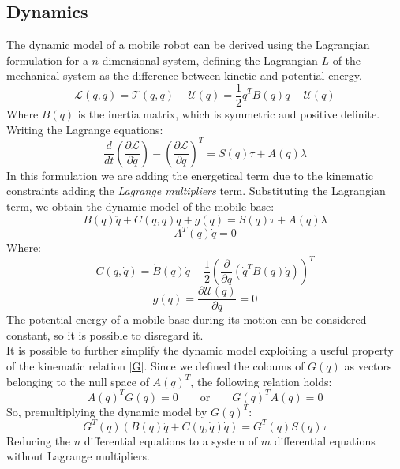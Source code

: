 \subsection{Dynamics}
The dynamic model of a mobile robot can be derived using the Lagrangian formulation for a $n$-dimensional system, defining the Lagrangian $L$ of the mechanical system as the difference between kinetic and potential energy.
\begin{equation}
\mathcal{L}(q,\dot{q})=\mathcal{T}(q,\dot{q})-\mathcal{U}(q)=\frac{1}{2}\dot{q}^T B(q)\dot{q} - \mathcal{U}(q)
\end{equation}
Where $B(q)$ is the inertia matrix, which is symmetric and positive definite.\\
Writing the Lagrange equations:
\begin{equation}
\frac{d}{dt}\left(\frac{\partial\mathcal{L}}{\partial\dot{q}} \right) - \left(\frac{\partial\mathcal{L}}{\partial q} \right)^T=S(q)\tau+A(q)\lambda
\end{equation}
In this formulation we are adding the energetical term due to the kinematic constraints adding the \textit{Lagrange multipliers} term. 
Substituting the Lagrangian term, we obtain the dynamic model of the mobile base:
\begin{equation}
B(q)\ddot{q}+C(q,\dot{q})\dot{q}+g(q) = S(q)\tau+A(q)\lambda
\end{equation}
\begin{equation*} 
A^T \left( q \right)\dot{q} =0  
\end{equation*}
Where:
\begin{equation}
C(q,\dot{q})=\dot{B}(q)\dot{q}-\frac{1}{2}\left(\frac{\partial}{\partial q}\left( \dot{q}^T B(q)\dot{q}\right)\right)^T
\end{equation}
\begin{equation}
g(q) = \frac{\partial\mathcal{U}(q)}{\partial q} = 0
\end{equation}
The potential energy of a mobile base during its motion can be considered constant, so it is possible to disregard it.\\
It is possible to further simplify the dynamic model exploiting a useful property of the kinematic relation \ref{G}. Since we defined the coloums of $G(q)$ as vectors belonging to the null space of $A(q)^T$, the following relation holds:
\begin{equation}
A(q)^T G(q) = 0 \qquad\textrm{or}\qquad G(q)^T A(q) = 0
\end{equation}
So, premultiplying the dynamic model by $G(q)^T$:
\begin{equation} \label{premultiplicationbyG}
G^T(q)\left(B(q)\ddot{q}+C(q,\dot{q})\dot{q}\right) = G^T(q)S(q)\tau
\end{equation}
Reducing the $n$ differential equations to a system of $m$ differential equations without Lagrange multipliers.
